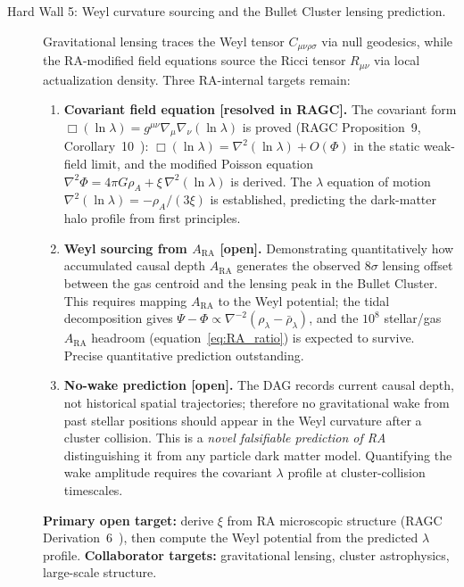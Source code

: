 \documentclass[11pt,a4paper]{article}
\theoremstyle{plain}
\theoremstyle{definition}
\theoremstyle{remark}
\newcommand{\ARA}{A_{\mathrm{RA}}}
\begin{document}
\begin{description}
  \item[Hard Wall 5: Weyl curvature sourcing and the Bullet Cluster lensing
  prediction.] Gravitational lensing traces the Weyl tensor
  $C_{\mu\nu\rho\sigma}$ via null geodesics, while the RA-modified field
  equations source the Ricci tensor $R_{\mu\nu}$ via local actualization
  density. Three RA-internal targets remain:
  \begin{enumerate}[noitemsep]
  \item \textbf{Covariant field equation [resolved in RAGC].}
  The covariant form $\Box(\ln\lambda) = g^{\mu\nu}\nabla_\mu\nabla_\nu(\ln\lambda)$
  is proved (RAGC Proposition~9, Corollary~10~\citep{Sandeman2026b}):
  $\Box(\ln\lambda) = \nabla^2(\ln\lambda) + O(\Phi)$ in the static
  weak-field limit, and the modified Poisson equation
  $\nabla^2\Phi = 4\pi G\rho_A + \xi\,\nabla^2(\ln\lambda)$ is derived.
  The $\lambda$ equation of motion $\nabla^2(\ln\lambda) = -\rho_A/(3\xi)$
  is established, predicting the dark-matter halo profile from first principles.
  \item \textbf{Weyl sourcing from $A_{\mathrm{RA}}$ [open].}
  Demonstrating quantitatively how accumulated causal depth $\ARA$
  generates the observed $8\sigma$ lensing offset between the
  gas centroid and the lensing peak in the Bullet Cluster.
  This requires mapping $\ARA$ to the Weyl potential; the tidal
  decomposition gives $\Psi - \Phi \propto \nabla^{-2}(\rho_\lambda - \bar\rho_\lambda)$,
  and the $10^8$ stellar/gas $\ARA$ headroom (equation~\eqref{eq:RA_ratio})
  is expected to survive. Precise quantitative prediction outstanding.
  \item \textbf{No-wake prediction [open].}
  The DAG records current causal depth, not historical spatial trajectories;
  therefore no gravitational wake from past stellar positions should appear
  in the Weyl curvature after a cluster collision. This is a
  \emph{novel falsifiable prediction of RA} distinguishing it from
  any particle dark matter model. Quantifying the wake amplitude
  requires the covariant $\lambda$ profile at cluster-collision timescales.
  \end{enumerate}
  \textbf{Primary open target:} derive $\xi$ from RA microscopic structure
  (RAGC Derivation~6~\citep{Sandeman2026b}), then compute the Weyl potential
  from the predicted $\lambda$ profile.
  \textbf{Collaborator targets:} gravitational lensing, cluster astrophysics,
  large-scale structure.
\end{description}

\end{document}
